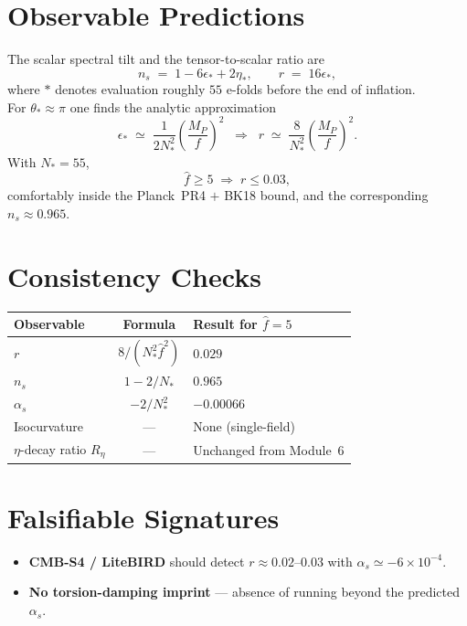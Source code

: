 \documentclass[12pt]{article}
\begin{document}
\section{Observable Predictions}
The scalar spectral tilt and the tensor-to-scalar ratio are
\[
n_s \;=\; 1 - 6\epsilon_* + 2\eta_*,
\qquad
r \;=\; 16\epsilon_*,
\]
where $*$ denotes evaluation roughly $55$ e-folds before the end of inflation.\\[4pt]
For $\theta_* \approx \pi$ one finds the analytic approximation
\[
\epsilon_* \;\simeq\; \frac{1}{2N_*^2}\left(\frac{M_P}{f}\right)^2
\;\;\Longrightarrow\;\;
r \;\simeq\; \frac{8}{N_*^2}\left(\frac{M_P}{f}\right)^2.
\]
With $N_*=55$,
\[
\hat f \ge 5 \;\Longrightarrow\; r \le 0.03,
\]
comfortably inside the Planck~PR4 $+$ BK18 bound, and the corresponding $n_s \approx 0.965$.

\section{Consistency Checks}
\begin{center}
\begin{tabular}{lcl}
\textbf{Observable} & \textbf{Formula} & \textbf{Result for $\hat f=5$}\\\hline
$r$ & $8/(N_*^2 \hat f^2)$ & $0.029$\\
$n_s$ & $1 - 2/N_*$ & $0.965$\\
$\alpha_s$ & $-2/N_*^2$ & $-0.00066$\\
Isocurvature & --- & None (single-field)\\
$\eta$-decay ratio $R_\eta$ & --- & Unchanged from Module~6
\end{tabular}
\end{center}

\section{Falsifiable Signatures}
\begin{itemize}
    \item \textbf{CMB-S4 / LiteBIRD} should detect $r \approx 0.02$--$0.03$ with $\alpha_s \simeq -6\times10^{-4}$.
    \item \textbf{No torsion-damping imprint} --- absence of running beyond the predicted $\alpha_s$.
\end{itemize}
\end{document}

